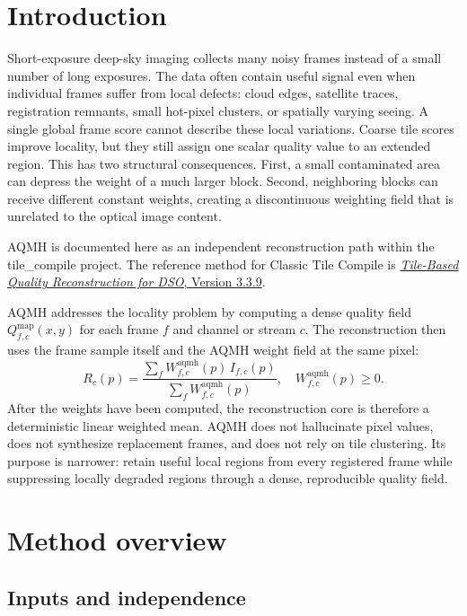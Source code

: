 \documentclass[10pt,twocolumn]{article}
\begin{document}
\section{Introduction}

Short-exposure deep-sky imaging collects many noisy frames instead of a small number of long
exposures. The data often contain useful signal even when individual frames suffer from local
defects: cloud edges, satellite traces, registration remnants, small hot-pixel clusters, or
spatially varying seeing. A single global frame score cannot describe these local variations.
Coarse tile scores improve locality, but they still assign one scalar quality value to an
extended region. This has two structural consequences. First, a small contaminated area can
depress the weight of a much larger block. Second, neighboring blocks can receive different
constant weights, creating a discontinuous weighting field that is unrelated to the optical
image content.

AQMH is documented here as an independent reconstruction path within the tile\_compile project.
The reference method for Classic Tile Compile is
\href{https://doi.org/10.5281/zenodo.19437794}{\emph{Tile-Based Quality Reconstruction for DSO},
Version 3.3.9}.

AQMH addresses the locality problem by computing a dense quality field
$Q_{f,c}^{\mathrm{map}}(x,y)$ for each frame $f$ and channel or stream $c$. The reconstruction
then uses the frame sample itself and the AQMH weight field at the same pixel:
\begin{equation}
  R_c(p) =
  \frac{\sum_f W_{f,c}^{\mathrm{aqmh}}(p)\, I_{f,c}(p)}
       {\sum_f W_{f,c}^{\mathrm{aqmh}}(p)} ,
  \quad W_{f,c}^{\mathrm{aqmh}}(p) \ge 0 .
\end{equation}
After the weights have been computed, the reconstruction core is therefore a deterministic linear
weighted mean. AQMH does not hallucinate pixel values, does not synthesize replacement frames, and
does not rely on tile clustering. Its purpose is narrower: retain useful local regions from every
registered frame while suppressing locally degraded regions through a dense, reproducible quality
field.

\section{Method overview}

\subsection{Inputs and independence}
\end{document}
